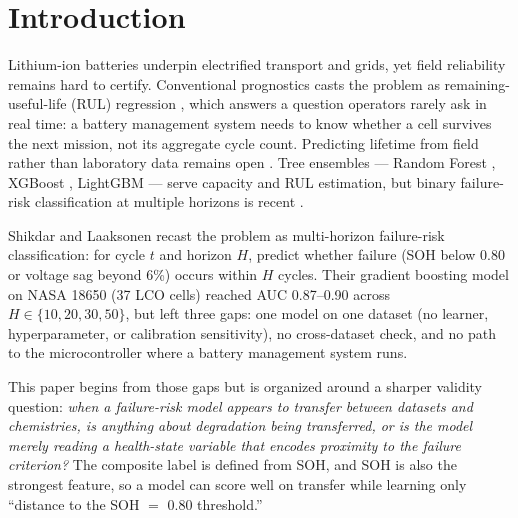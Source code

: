 \documentclass[preprint,12pt]{elsarticle}
\begin{document}
\section{Introduction}
Lithium-ion batteries underpin electrified transport and grids, yet field reliability remains hard to certify. Conventional prognostics casts the problem as remaining-useful-life (RUL) regression \cite{meng2019review,roman2021machine}, which answers a question operators rarely ask in real time: a battery management system needs to know whether a cell survives the next mission, not its aggregate cycle count. Predicting lifetime from field rather than laboratory data remains open \cite{sulzer2021challenge}. Tree ensembles --- Random Forest \cite{breiman2001random}, XGBoost \cite{chen2016xgboost}, LightGBM \cite{ke2017lightgbm} --- serve capacity and RUL estimation, but binary failure-risk classification at multiple horizons is recent \cite{shikdar2026learning}.

Shikdar and Laaksonen \cite{shikdar2026learning} recast the problem as multi-horizon failure-risk classification: for cycle $t$ and horizon $H$, predict whether failure (SOH below 0.80 or voltage sag beyond 6\%) occurs within $H$ cycles. Their gradient boosting model on NASA 18650 (37 LCO cells) reached AUC 0.87--0.90 across $H \in \{10,20,30,50\}$, but left three gaps: one model on one dataset (no learner, hyperparameter, or calibration sensitivity), no cross-dataset check, and no path to the microcontroller where a battery management system runs.

This paper begins from those gaps but is organized around a sharper validity question: \emph{when a failure-risk model appears to transfer between datasets and chemistries, is anything about degradation being transferred, or is the model merely reading a health-state variable that encodes proximity to the failure criterion?} The composite label is defined from SOH, and SOH is also the strongest feature, so a model can score well on transfer while learning only ``distance to the SOH $=$ 0.80 threshold.''
\end{document}

